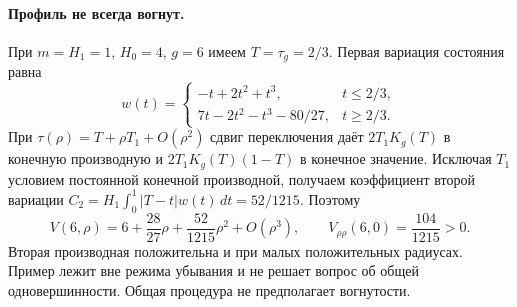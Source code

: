 \paragraph{Профиль не всегда вогнут.}
\label{gapregime:nonconcavity}
При $m=H_1=1$, $H_0=4$, $g=6$ имеем $T=\tau_g=2/3$.
Первая вариация состояния равна
\[
 w(t)=
 \begin{cases}
 -t+2t^2+t^3,&t\le2/3,\\
 7t-2t^2-t^3-80/27,&t\ge2/3.
 \end{cases}
\]
При $\tau(\rho)=T+\rho T_1+O(\rho^2)$ сдвиг переключения
даёт $2T_1K_g(T)$ в конечную производную и
$2T_1K_g(T)(1-T)$ в конечное значение.
Исключая $T_1$ условием постоянной конечной производной,
получаем коэффициент второй вариации
$C_2=H_1\int_0^1|T-t|w(t)\,dt=52/1215$. Поэтому
\[
 V(6,\rho)=6+\frac{28}{27}\rho+\frac{52}{1215}\rho^2+O(\rho^3),
 \qquad V_{\rho\rho}(6,0)=\frac{104}{1215}>0.
\]
Вторая производная положительна и при малых положительных радиусах.
Пример лежит вне режима убывания и не решает вопрос об общей
одновершинности. Общая процедура не предполагает вогнутости.
